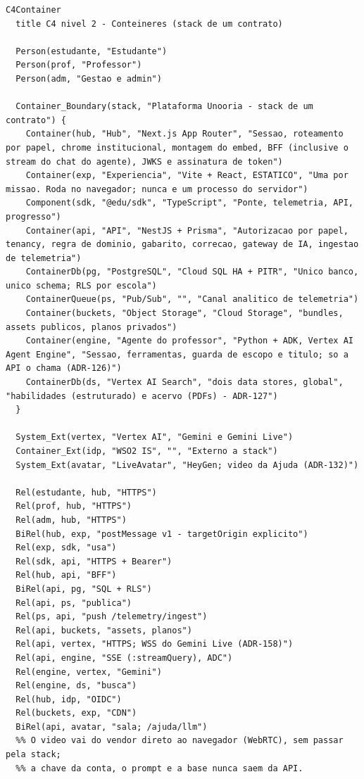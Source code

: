 \begin{lstlisting}[language=mermaid]
C4Container
  title C4 nivel 2 - Conteineres (stack de um contrato)

  Person(estudante, "Estudante")
  Person(prof, "Professor")
  Person(adm, "Gestao e admin")

  Container_Boundary(stack, "Plataforma Unooria - stack de um contrato") {
    Container(hub, "Hub", "Next.js App Router", "Sessao, roteamento por papel, chrome institucional, montagem do embed, BFF (inclusive o stream do chat do agente), JWKS e assinatura de token")
    Container(exp, "Experiencia", "Vite + React, ESTATICO", "Uma por missao. Roda no navegador; nunca e um processo do servidor")
    Component(sdk, "@edu/sdk", "TypeScript", "Ponte, telemetria, API, progresso")
    Container(api, "API", "NestJS + Prisma", "Autorizacao por papel, tenancy, regra de dominio, gabarito, correcao, gateway de IA, ingestao de telemetria")
    ContainerDb(pg, "PostgreSQL", "Cloud SQL HA + PITR", "Unico banco, unico schema; RLS por escola")
    ContainerQueue(ps, "Pub/Sub", "", "Canal analitico de telemetria")
    Container(buckets, "Object Storage", "Cloud Storage", "bundles, assets publicos, planos privados")
    Container(engine, "Agente do professor", "Python + ADK, Vertex AI Agent Engine", "Sessao, ferramentas, guarda de escopo e titulo; so a API o chama (ADR-126)")
    ContainerDb(ds, "Vertex AI Search", "dois data stores, global", "habilidades (estruturado) e acervo (PDFs) - ADR-127")
  }

  System_Ext(vertex, "Vertex AI", "Gemini e Gemini Live")
  Container_Ext(idp, "WSO2 IS", "", "Externo a stack")
  System_Ext(avatar, "LiveAvatar", "HeyGen; video da Ajuda (ADR-132)")

  Rel(estudante, hub, "HTTPS")
  Rel(prof, hub, "HTTPS")
  Rel(adm, hub, "HTTPS")
  BiRel(hub, exp, "postMessage v1 - targetOrigin explicito")
  Rel(exp, sdk, "usa")
  Rel(sdk, api, "HTTPS + Bearer")
  Rel(hub, api, "BFF")
  BiRel(api, pg, "SQL + RLS")
  Rel(api, ps, "publica")
  Rel(ps, api, "push /telemetry/ingest")
  Rel(api, buckets, "assets, planos")
  Rel(api, vertex, "HTTPS; WSS do Gemini Live (ADR-158)")
  Rel(api, engine, "SSE (:streamQuery), ADC")
  Rel(engine, vertex, "Gemini")
  Rel(engine, ds, "busca")
  Rel(hub, idp, "OIDC")
  Rel(buckets, exp, "CDN")
  BiRel(api, avatar, "sala; /ajuda/llm")
  %% O video vai do vendor direto ao navegador (WebRTC), sem passar pela stack;
  %% a chave da conta, o prompt e a base nunca saem da API.
\end{lstlisting}

